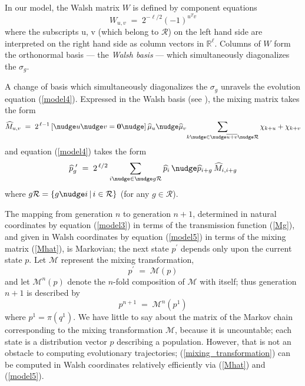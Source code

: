 In our model, the Walsh matrix $W$
is defined by component equations
\[
W_{u,v} \; = \; 2^{-\ell/2} (-1)^{u^T v}
\]
where the subscripts \nudge u, \nudge v (which belong to $\mathcal{R}$) on the left hand side are interpreted on the right hand side as column vectors in $\mathbb{R}^{\ell}$.
Columns of $W$ form the orthonormal basis --- the
{\em Walsh basis\/} --- which simultaneously diagonalizes the
$\sigma_g$.

A change of basis which simultaneously diagonalizes the $\sigma_g$
unravels the evolution equation (\ref{model4}).  
Expressed in the Walsh basis (see \cite{Vose1999}), the mixing matrix
takes the form
\begin{equation}
\label{Mhat}
\widehat{M}_{u,v} \; = \; 2^{\,\ell-1} \,[\nudge u \nudge v = {\bf
    0}\nudge]\, \widehat{\mu}_u \nudge \widehat{\mu}_v \!  \sum_{k
  \nudge \in \nudge \overline{u+v} \nudge \mathcal{R}} \chi_{k + u} +
\chi_{k + v}
\end{equation}
and equation (\ref{model4}) takes the form
\begin{equation}
\label{model5}
\widehat{p}_g^{\,\,\prime} \; = \; 2^{\,\ell/2} \sum_{i \nudge \in \nudge g \mathcal{R}}
\widehat{p}_i \, \nudge \widehat{p}_{i+g} \,\widehat{M}_{i,i+g}
\end{equation}
where $g \mathcal{R} = \{g \nudge i \, | \, i \in \mathcal{R} \}$ (for
any $g \in \mathcal{R}$).

The mapping from generation $n$ to generation $n+1$, determined in
natural coordinates by equation (\ref{model3}) in terms of the
transmission function (\ref{Mg}), and given in Walsh coordinates by
equation (\ref{model5}) in terms of the mixing matrix (\ref{Mhat}), is
Markovian; the next state $p^\prime$ depends only upon the current
state $p$.  Let $\mathcal{M}$ represent the mixing transformation,
\begin{equation} \label{mixing_transformation}
p^\prime \; = \; \mathcal{M}(p)
\end{equation}
and let $\mathcal{M}^n(p)$ denote the $n$-fold composition of
$\mathcal{M}$ with itself; thus generation $n+1$ is described by
\[
p^{n+1} \; = \; \mathcal{M}^n(p^1)
\]
where $p^1 = \pi (q^1)$.  We have little to say
about the matrix of the Markov chain corresponding to the mixing
transformation $\mathcal{M}$, because it is uncountable; each state is
a distribution vector $p$ describing a population. However, that is
not an obstacle to computing evolutionary trajectories;
(\ref{mixing_transformation}) can be computed in Walsh coordinates
relatively efficiently via (\ref{Mhat}) and (\ref{model5}).


